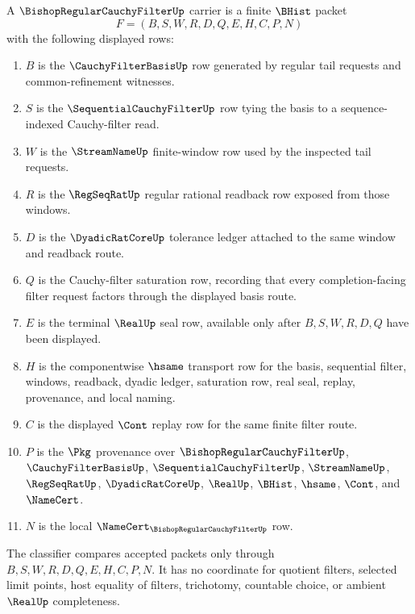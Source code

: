\begin{definition}
\label{def:bishop-regular-cauchy-filter-carrier}
A $\BishopRegularCauchyFilterUp$ carrier is a finite $\BHist$ packet
$$
F=(B,S,W,R,D,Q,E,H,C,P,N)
$$
with the following displayed rows:
\begin{enumerate}
\item $B$ is the $\CauchyFilterBasisUp$ row generated by regular tail requests and common-refinement witnesses.
\item $S$ is the $\SequentialCauchyFilterUp$ row tying the basis to a sequence-indexed Cauchy-filter read.
\item $W$ is the $\StreamNameUp$ finite-window row used by the inspected tail requests.
\item $R$ is the $\RegSeqRatUp$ regular rational readback row exposed from those windows.
\item $D$ is the $\DyadicRatCoreUp$ tolerance ledger attached to the same window and readback route.
\item $Q$ is the Cauchy-filter saturation row, recording that every completion-facing filter request factors through the displayed basis route.
\item $E$ is the terminal $\RealUp$ seal row, available only after $B,S,W,R,D,Q$ have been displayed.
\item $H$ is the componentwise $\hsame$ transport row for the basis, sequential filter, windows, readback, dyadic ledger, saturation row, real seal, replay, provenance, and local naming.
\item $C$ is the displayed $\Cont$ replay row for the same finite filter route.
\item $P$ is the $\Pkg$ provenance over $\BishopRegularCauchyFilterUp$, $\CauchyFilterBasisUp$, $\SequentialCauchyFilterUp$, $\StreamNameUp$, $\RegSeqRatUp$, $\DyadicRatCoreUp$, $\RealUp$, $\BHist$, $\hsame$, $\Cont$, and $\NameCert$.
\item $N$ is the local $\NameCert_{\BishopRegularCauchyFilterUp}$ row.
\end{enumerate}
The classifier compares accepted packets only through $B,S,W,R,D,Q,E,H,C,P,N$. It has no coordinate for quotient filters, selected limit points, host equality of filters, trichotomy, countable choice, or ambient $\RealUp$ completeness.
\end{definition}

